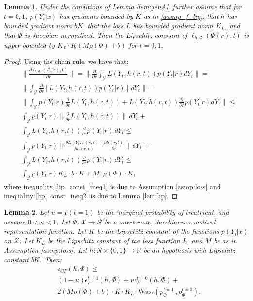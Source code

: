 \documentclass{article}
\newtheorem{thmapplem}{Lemma}
\def\cX{\mathcal X}
\def\cY{\mathcal Y}
\def\cR{\mathcal{R}}
\def \R{\mathbb{R}}
\newcommand{\pc}{p^{t=0}}
\newcommand{\pt}{p^{t=1}}
\newcommand{\lythr}{\ell_{h,\Phi}(\Psi(r),t)}
\begin{document}
\begin{thmapplem}\label{lem:errlip}
Under the conditions of Lemma \ref{lem:genA}, further assume that for $t=0,1$, $p(Y_t|x)$ has gradients bounded by $K$ as in \ref{assmp_f_lip}, that $h$ has bounded gradient norm $b K$, that the loss $L$ has bounded gradient norm $K_L$, and that $\Phi$ is Jacobian-normalized. Then the Lipschitz constant of $ \lythr$ is upper bounded by $K_L \cdot K \left(M \rho(\Phi) +  b \right)$ for $t=0,1$.
\end{thmapplem}
\begin{proof}
Using the chain rule, we have that:
\begin{align}
& \|\frac{\partial \lythr}{\partial r}\| =\| \frac{\partial}{\partial r} \int_\cY L(Y_t,h(r,t))  p(Y_t|r) dY_t \|= \nonumber \\
& \| \int_\cY \frac{\partial}{\partial r} \left[ L(Y_t,h(r,t))  p(Y_t|r)\right] \, dY_t \| = \nonumber \\
& \| \int_\cY \! p(Y_t|r)\frac{\partial}{\partial r} \! L(Y_t,h(r,t)) \!   +\! L(Y_t,h(r,t)) \frac{\partial}{\partial r} \! p(Y_t|r)  dY_t \|  \leq  \nonumber \\
& \int_\cY p(Y_t|r) \| \frac{\partial}{\partial r} L(Y_t,h(r,t)) \| \, dY_t + \nonumber\\
& \int_\cY  L(Y_t,h(r,t)) \frac{\partial}{\partial r} p(Y_t|r) \, dY_t \leq \label{lip_const_ineq1}\\
& \int_\cY p(Y_t|r) \| \frac{\partial L(Y_t,h(r,t))}{\partial h(r,t) }  \frac{\partial h(r,t)}{\partial r} \| \, dY_t + \nonumber\\
& \int_\cY  L(Y_t,h(r,t)) \frac{\partial}{\partial r} p(Y_t|r) \, dY_t \leq \label{lip_const_ineq2}\\
& \int_\cY p(Y_t|r) K_L \cdot b \cdot K + M \cdot \rho(\Phi) \cdot  K,
\end{align}
where inequality \ref{lip_const_ineq1} is due to Assumption \ref{asmp:loss} and inequality \ref{lip_const_ineq2} is due to Lemma \ref{lem:lip}.
\end{proof}



\begin{thmapplem}\label{thm:wasA}
Let $u = p(t=1)$ be the marginal probability of treatment, and assume $0<u<1$. Let $\Phi : \cX \rightarrow \cR$ be a one-to-one, Jacobian-normalized representation function. Let $K$ be the Lipschitz constant of the functions $p(Y_t|x)$ on $\cX$. Let $K_L$ be the Lipschitz constant of the loss function $L$, and $M$ be as in Assumption \ref{asmp:loss}. Let $h : \cR \times \{0,1\} \rightarrow \R$ be an hypothesis with Lipschitz constant $b K$.
Then:
\begin{align}\label{eq:thm_wasA}
&\epsilon_{CF}(h,\Phi) \leq  \nonumber \\
&(1-u)  \epsilon^{t=1}_F(h,\Phi) + u  \epsilon^{t=0}_F(h,\Phi)  + \nonumber \\
& 2 \left(M \rho(\Phi) +b\right) \cdot K  \cdot K_L \cdot \text{Wass}(\pt_\Phi \, , \pc_\Phi).
\end{align}
\end{thmapplem}
\end{document}
